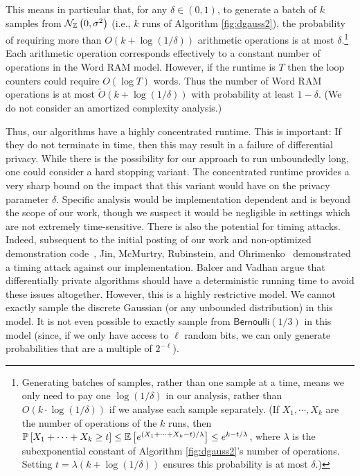 \documentclass{jpc}
\newcommand{\dgausss}[2]{{\discN\left(#1,#2\right)}}
\newcommand{\dgauss}[1]{\dgausss{0}{#1}}
\newcommand{\ex}[2]{{\ifx&#1& \mathbb{E} \else
\underset{#1}{\mathbb{E}} \fi \left[#2\right]}}
\newcommand{\pr}[2]{{\ifx&#1& \mathbb{P} \else
\underset{#1}{\mathbb{P}} \fi \left[#2\right]}}
\newcommand{\bern}{\mathsf{Bernoulli}}
\begin{document}
This means in particular that, for any $\delta \in (0,1)$, to generate a batch of $k$ samples from $\dgauss{\sigma^2}$ (i.e., $k$ runs of Algorithm \ref{fig:dgauss2}), the probability of requiring more than $O(k + \log(1/\delta))$ arithmetic operations is at most $\delta$.\footnote{Generating batches of samples, rather than one sample at a time, means we only need to pay one $\log(1/\delta)$ in our analysis, rather than $O(k \cdot \log(1/\delta))$ if we analyse each sample separately. (If $X_1,\cdots,X_k$ are the number of operations of the $k$ runs, then $\pr{}{X_1 + \cdots + X_k \ge t} \le \ex{}{e^{(X_1 + \cdots + X_k-t)/\lambda}} \le e^{k-t/\lambda}$, where $\lambda$ is the subexponential constant of Algorithm \ref{fig:dgauss2}'s number of operations. Setting $t=\lambda(k+\log(1/\delta))$ ensures this probability is at most $\delta$.)} Each arithmetic operation corresponds effectively to a constant number of operations in the Word RAM model. However, if the runtime is $T$ then the loop counters could require $O(\log T)$ words. Thus the number of Word RAM operations is at most $\tilde{O}(k + \log(1/\delta))$ with probability at least $1-\delta$. (We do not consider an amortized complexity analysis.)

Thus, our algorithms have a highly concentrated runtime. This is important: If they do not terminate in time, then this may result in a failure of differential privacy. 
While there is the possibility for our approach to run unboundedly long, one could consider a hard stopping variant.
The concentrated runtime provides a very sharp bound on the impact that this variant would have on the privacy parameter $\delta$.
Specific analysis would be implementation dependent and is beyond the scope of our work, though we suspect it would be negligible in settings which are not extremely time-sensitive.
There is also the potential for timing attacks.
Indeed, subsequent to the initial posting of our work and non-optimized demonstration code~\cite{CKS20,DGaussGithub}, Jin, McMurtry, Rubinstein, and Ohrimenko~\cite{JinMRO21} demonstrated a timing attack against our implementation. 
Balcer and Vadhan \cite{BalcerV17} argue that differentially private algorithms should have a deterministic running time to avoid these issues altogether. However, this is a highly restrictive model. We cannot exactly sample the discrete Gaussian (or any unbounded distribution) in this model. It is not even possible to exactly sample from $\bern(1/3)$ in this model (since, if we only have access to $\ell$ random bits, we can only generate probabilities that are a multiple of $2^{-\ell}$). 
\end{document}
